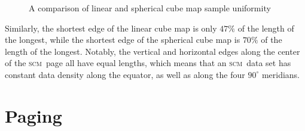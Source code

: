\documentclass[oneside,11pt]{memoir}
\newcommand{\scm}     {\textsc{scm}}
\begin{document}
\begin{Spacing}{1.1}
\begin{figure}
  \centering
  \hfil
  \hfil
  \caption{A comparison of linear and spherical cube map sample uniformity}
  \label{fig:uniformity}
\end{figure}

Similarly, the shortest edge of the linear cube map is only $47\%$ of the length of the longest, while the shortest edge of the spherical cube map is $70\%$ of the length of the longest.  Notably, the vertical and horizontal edges along the center of the \scm\ page all have equal lengths, which means that an \scm\ data set has constant data density along the equator, as well as along the four $90^\circ$ meridians.

\section{Paging}
\label{paging}


\end{Spacing}
\end{document}
